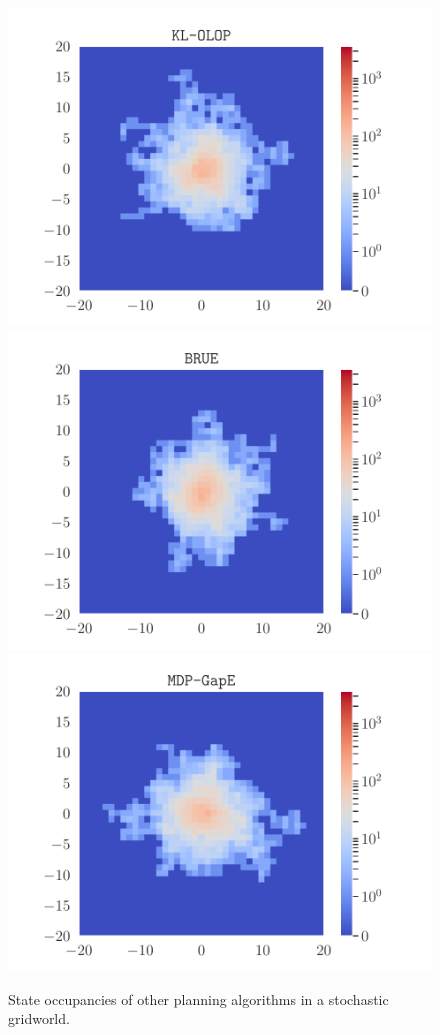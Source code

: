 \documentclass[runningheads]{llncs}
\begin{document}
\begin{figure}[th]
	\centering
	\includegraphics[trim={1.8cm 0.7cm 1.8cm 0.7cm}, clip, width=0.49\linewidth]{img/occupations_KL-OLOP.pdf}
	\hfill
	\includegraphics[trim={1.8cm 0.7cm 1.8cm 0.7cm}, clip, width=0.49\linewidth]{img/occupations_BRUE.pdf}\\
	\includegraphics[trim={1.8cm 0.7cm 1.8cm 0.7cm}, clip, width=0.49\linewidth]{img/occupations_MDP-GapE.pdf}
	\caption{State occupancies of other planning algorithms in a stochastic gridworld.}
	\label{fig:suppl-occupancies}
\end{figure}
\end{document}
